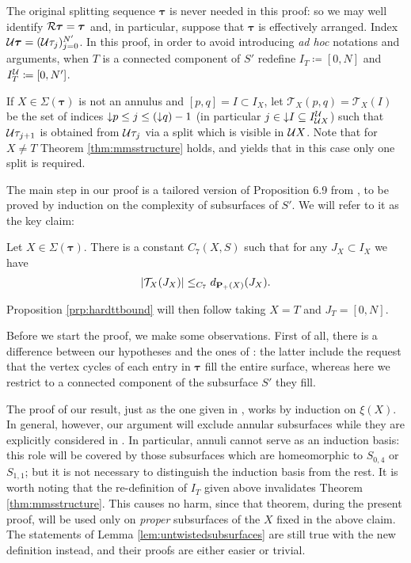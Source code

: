 The original splitting sequence $\bm\tau$ is never needed in this proof: so we may well identify ${\mathcal R}\bm\tau=\bm\tau$ and, in particular, suppose that $\bm\tau$ is effectively arranged. Index ${\mathcal U}\bm\tau=({\mathcal U}\tau_j)_{j=0}^{N'}$. In this proof, in order to avoid introducing \emph{ad hoc} notations and arguments, when $T$ is a connected component of $S'$ redefine $I_T\coloneqq[0,N]$ and $I_T^{\mathcal U}\coloneqq [0,N']$. 

If $X\in \Sigma(\bm\tau)$ is not an annulus and $[p,q]=I\subset I_X$, let $\mathcal T_X(p,q)=\mathcal T_X(I)$ be the set of indices $\mathord{\downarrow} p\leq j\leq (\mathord{\downarrow} q)-1$ (in particular $j\in \mathord{\downarrow} I\subseteq I_{{\mathcal U} X}^{\mathcal U}$) such that ${\mathcal U}\tau_{j+1}$ is obtained from ${\mathcal U}\tau_j$ via a split which is visible in ${\mathcal U} X$. Note that for $X\not= T$ Theorem \ref{thm:mmsstructure} holds, and yields that in this case only one split is required. 

The main step in our proof is a tailored version of Proposition 6.9 from \cite{mms}, to be proved by induction on the complexity of subsurfaces of $S'$. We will refer to it as the key claim:

\begin{claim}
Let $X\in \Sigma(\bm\tau)$. There is a constant $C_7(X,S)$ such that for any $J_X\subset I_X$ we have
$$|\mathcal T_X(J_X)|\leq_{C_7} d_{{\mathbf{P}_+}(X)}(J_X).$$
\end{claim}

Proposition \ref{prp:hardttbound} will then follow taking $X=T$ and $J_T=[0,N]$.

Before we start the proof, we make some observations. First of all, there is a difference between our hypotheses and the ones of \cite{mms}: the latter include the request that the vertex cycles of each entry in $\bm\tau$ fill the entire surface, whereas here we restrict to a connected component of the subsurface $S'$ they fill. 

The proof of our result, just as the one given in \cite{mms}, works by induction on $\xi(X)$. In general, however, our argument will exclude annular subsurfaces while they are explicitly considered in \cite{mms}. In particular, annuli cannot serve as an induction basis: this role will be covered by those subsurfaces which are homeomorphic to $S_{0,4}$ or $S_{1,1}$; but it is not necessary to distinguish the induction basis from the rest. It is worth noting that the re-definition of $I_T$ given above invalidates Theorem \ref{thm:mmsstructure}. This causes no harm, since that theorem, during the present proof, will be used only on \emph{proper} subsurfaces of the $X$ fixed in the above claim. The statements of Lemma \ref{lem:untwistedsubsurfaces} are still true with the new definition instead, and their proofs are either easier or trivial.

